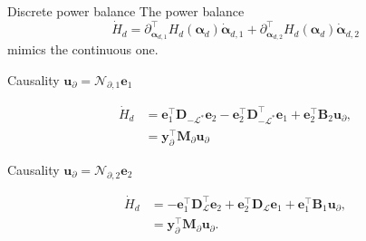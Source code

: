 \documentclass[aspectratio=169]{ISAE-Beamer}
\begin{document}
\begin{frame}{Discrete power balance}
The power balance
\begin{equation*}
\dot{H}_d = \partial_{\bm{\alpha}_{d, 1}}^\top H_d(\bm{\alpha}_d) \dot{\bm{\alpha}}_{d, 1} + \partial_{\bm{\alpha}_{d, 2}}^\top H_d(\bm{\alpha}_d) \dot{\bm{\alpha}}_{d, 2}
\end{equation*}
mimics the continuous one.

\begin{exampleblock}{Causality $\bm{u}_\partial = \mathcal{N}_{\partial, 1} \displaystyle \bm{e}_1$}
	
	\begin{equation*}
	\begin{aligned}
	\dot{H}_d &= \mathbf{e}_{1}^\top \mathbf{D}_{-\mathcal{L}^*} \mathbf{e}_{2} - \mathbf{e}_{2}^\top \mathbf{D}_{-\mathcal{L}^*}^\top \mathbf{e}_{1} + \mathbf{e}_{2}^\top \mathbf{B}_2 \mathbf{u}_\partial, \\
	& = \mathbf{y}_\partial^\top \mathbf{M}_\partial \mathbf{u}_\partial
	\end{aligned}
	\end{equation*}
	
\end{exampleblock}

\begin{exampleblock}{Causality $\bm{u}_\partial = \mathcal{N}_{\partial, 2} \displaystyle \bm{e}_2$}
	
\begin{equation*}
\begin{aligned}
\dot{H}_d &= - \mathbf{e}_{1}^\top \mathbf{D}_{\mathcal{L}}^\top \mathbf{e}_{2} + \mathbf{e}_{2}^\top \mathbf{D}_{\mathcal{L}} \mathbf{e}_{1} + \mathbf{e}_{1}^\top \mathbf{B}_1 \mathbf{u}_\partial, \\
& = \mathbf{y}_\partial^\top \mathbf{M}_\partial \mathbf{u}_\partial.
\end{aligned}
\end{equation*}

\end{exampleblock}

\end{frame}
\end{document}
